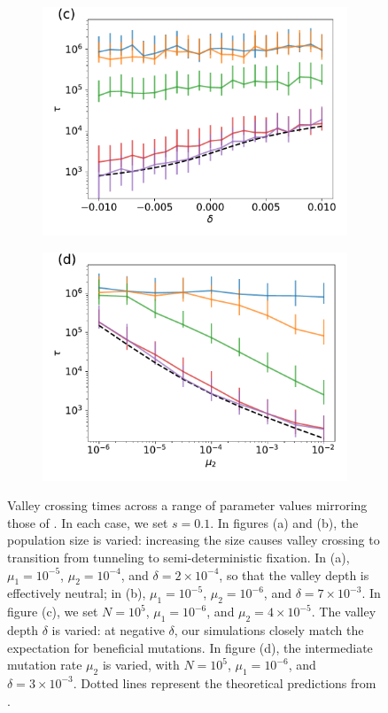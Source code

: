\documentclass[10pt,twocolumn,twoside]{gsajnl}
\begin{document}
\begin{spacing}{1.5}
\begin{figure}[t]
\begin{subfigure}[c]{0.48\textwidth}
\includegraphics[width=\textwidth]{Figures/julia_weissman_5c.pdf}
\end{subfigure}
\begin{subfigure}[d]{0.48\textwidth}
\includegraphics[width=\textwidth]{Figures/julia_weissman_5d.pdf}
\end{subfigure}
\caption{Valley crossing times across a range of parameter values mirroring those of \citet{weissman_2009}. In each case, we set $s = 0.1$. In figures (a) and (b), the population size is varied: increasing the size causes valley crossing to transition from tunneling to semi-deterministic fixation. In (a), $\mu_1 = 10^{-5}$, $\mu_2 = 10^{-4}$, and $\delta = 2 \times 10^{-4}$, so that the valley depth is effectively neutral; in (b), $\mu_1 = 10^{-5}$, $\mu_2 = 10^{-6}$, and $\delta = 7 \times 10^{-3}$. In figure (c), we set $N = 10^5$, $\mu_1 = 10^{-6}$, and $\mu_2 = 4 \times 10^{-5}$. The valley depth $\delta$ is varied: at negative $\delta$, our simulations closely match the expectation for beneficial mutations. In figure (d), the intermediate mutation rate $\mu_2$ is varied, with $N = 10^{5}$, $\mu_1 = 10^{-6}$, and $\delta = 3 \times 10^{-3}$. Dotted lines represent the theoretical predictions from \citet{weissman_2009}.}
\label{fig:weissman}
\end{figure}


\end{spacing}
\end{document}
